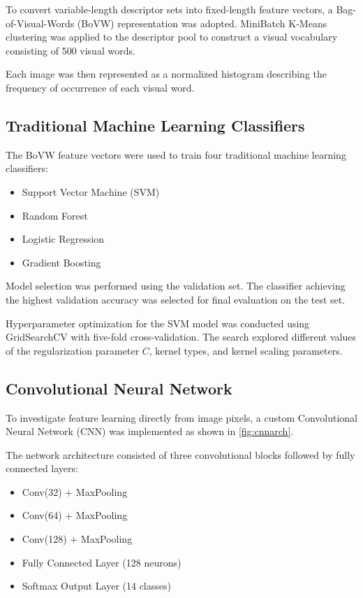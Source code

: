 To convert variable-length descriptor sets into fixed-length feature vectors, a Bag-of-Visual-Words (BoVW) representation was adopted. MiniBatch K-Means clustering \cite{minibatchkmeans} was applied to the descriptor pool to construct a visual vocabulary consisting of 500 visual words.

Each image was then represented as a normalized histogram describing the frequency of occurrence of each visual word.


\subsection{Traditional Machine Learning Classifiers}

The BoVW feature vectors were used to train four traditional machine learning classifiers:

\begin{itemize}
\item Support Vector Machine (SVM)
\item Random Forest
\item Logistic Regression
\item Gradient Boosting
\end{itemize}

Model selection was performed using the validation set. The classifier achieving the highest validation accuracy was selected for final evaluation on the test set.

Hyperparameter optimization for the SVM model was conducted using GridSearchCV with five-fold cross-validation. The search explored different values of the regularization parameter $C$, kernel types, and kernel scaling parameters.

\subsection{Convolutional Neural Network}

To investigate feature learning directly from image pixels, a custom Convolutional Neural Network (CNN) was implemented as shown in \cref{fig:cnnarch}.

The network architecture consisted of three convolutional blocks followed by fully connected layers:

\begin{itemize}
\item Conv(32) + MaxPooling
\item Conv(64) + MaxPooling
\item Conv(128) + MaxPooling
\item Fully Connected Layer (128 neurons)
\item Softmax Output Layer (14 classes)
\end{itemize}

